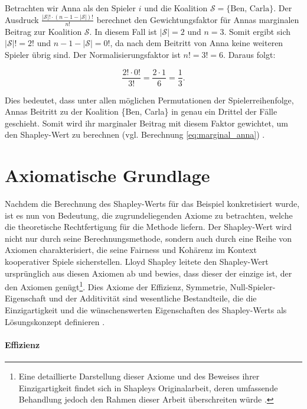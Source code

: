 Betrachten wir Anna als den Spieler $i$ und die Koalition \(\mathcal{S} = \{\text{Ben, Carla}\}\). 
Der Ausdruck \(\frac{|\mathcal{S}|! \cdot (n - 1 - |\mathcal{S}|)!}{n!}\) berechnet den Gewichtungsfaktor 
für Annas marginalen Beitrag zur Koalition \(\mathcal{S}\). In diesem Fall ist \(|\mathcal{S}| = 2\) und \(n = 3\). 
Somit ergibt sich \(|\mathcal{S}|! = 2!\) und \(n - 1 - |\mathcal{S}| = 0!\), da nach dem Beitritt von 
Anna keine weiteren Spieler übrig sind. Der Normalisierungsfaktor ist \(n! = 3! = 6\). Daraus folgt:

\begin{equation}
\frac{2! \cdot 0!}{3!} = \frac{2 \cdot 1}{6} = \frac{1}{3}.
\end{equation}

Dies bedeutet, dass unter allen möglichen Permutationen der Spielerreihenfolge, Annas Beitritt zu der Koalition \{Ben, Carla\} 
in genau ein Drittel der Fälle geschieht. Somit wird ihr marginaler Beitrag mit diesem Faktor gewichtet, 
um den Shapley-Wert zu berechnen (vgl. Berechnung \ref{eq:marginal_anna}) \cite[S. 21f]{Molnar_2023}.


\section{Axiomatische Grundlage}
\label{sec:axiome-shapley}

Nachdem die Berechnung des Shapley-Werts für das Beispiel konkretisiert wurde, ist es nun von Bedeutung, die zugrundeliegenden Axiome zu betrachten, 
welche die theoretische Rechtfertigung für die Methode liefern. Der Shapley-Wert wird nicht nur durch seine Berechnungsmethode, 
sondern auch durch eine Reihe von Axiomen charakterisiert, die seine Fairness und Kohärenz im Kontext kooperativer Spiele sicherstellen. 
Lloyd Shapley leitete den Shapley-Wert ursprünglich aus diesen Axiomen ab und bewies, 
dass dieser der einzige ist, der den Axiomen genügt\footnote{Eine detaillierte Darstellung dieser Axiome und des Beweises 
ihrer Einzigartigkeit findet sich in Shapleys Originalarbeit, deren umfassende Behandlung jedoch den Rahmen dieser Arbeit überschreiten würde \cite[S. 307-318]{Shapley+1953+307+318}.}. 
Dies Axiome der Effizienz, Symmetrie, Null-Spieler-Eigenschaft und der Additivität sind wesentliche Bestandteile, 
die die Einzigartigkeit und die wünschenswerten Eigenschaften des Shapley-Werts als Lösungskonzept definieren \cite[S. 22]{Molnar_2023}. 

\paragraph{\rmfamily\bfseries Effizienz}

